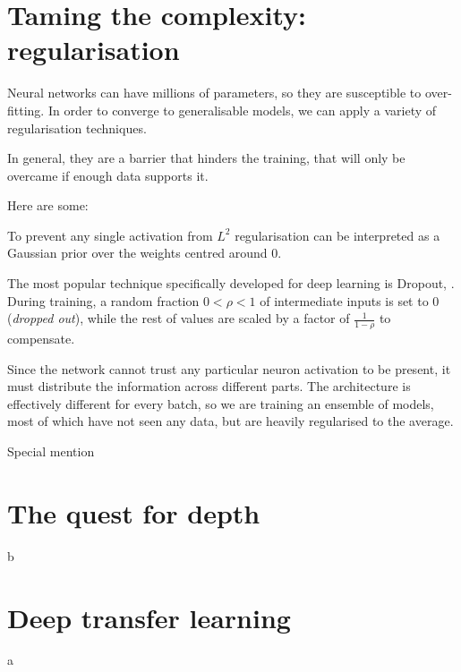 \section{Taming the complexity: regularisation}
Neural networks can have millions of parameters, so they are susceptible to over-fitting.
In order to converge to generalisable models, we can apply a variety of regularisation techniques.

In general, they are a barrier that hinders the training, that will only be overcame if enough data supports it.

Here are some:

To prevent any single activation from
$L^2$ regularisation can be interpreted as a Gaussian prior over the weights centred around $0$.

The most popular technique  
specifically developed for deep learning is Dropout, \citep{dropout}. 
During training, a random fraction $0 < \rho < 1$ of intermediate inputs is set to $0$ (\emph{dropped out}), while the rest of values are scaled by a factor of $\frac{1}{1-\rho}$ to compensate.

Since the network cannot trust any particular neuron activation to be present, it must distribute the information across different parts.
The architecture is effectively different for every batch, so we are training an ensemble of models, most of which have not seen any data, but are heavily regularised to the average.


Special mention


\section{The quest for depth}
b
\section{Deep transfer learning}
a



